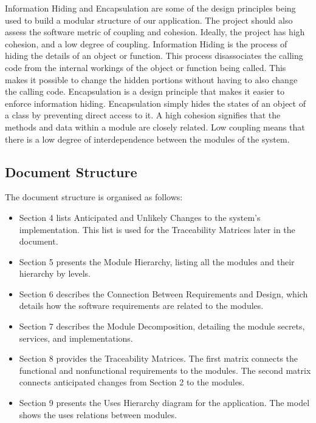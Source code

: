 \documentclass[12pt, titlepage]{article}
\begin{document}
Information Hiding and Encapsulation are some of the design principles being used to build a modular structure of our application. The project should also assess the software metric of coupling and cohesion. Ideally, the project has high cohesion, and a low degree of coupling.
Information Hiding is the process of hiding the details of an object or function. This process disassociates the calling code from the internal workings of the object or function being called. This makes it possible to change the hidden portions without having to also change the calling code. Encapsulation is a design principle that makes it easier to enforce information hiding. Encapsulation simply hides the states of an object of a class by preventing direct access to it. 
A high cohesion signifies that the methods and data within a module are closely related. Low coupling means that there is a low degree of interdependence between the modules of the system. 


\subsection{Document Structure}
	The document structure is organised as follows:
\begin{itemize}

\item Section 4 lists Anticipated and Unlikely Changes to the system's implementation. This list is used for the Traceability Matrices later in the document.

\item Section 5 presents the Module Hierarchy, listing all the modules and their hierarchy by levels. 

\item Section 6 describes the Connection Between Requirements and Design, which details how the software requirements are related to the modules. 

\item Section 7 describes the Module Decomposition, detailing the module secrets, services, and implementations. 

\item Section 8 provides the Traceability Matrices. The first matrix connects the functional and nonfunctional requirements to the modules. The second matrix connects anticipated changes from Section 2 to the modules.

\item Section 9 presents the Uses Hierarchy diagram for the application. The model shows the uses relations between modules.

\end{itemize}	
\end{document}
